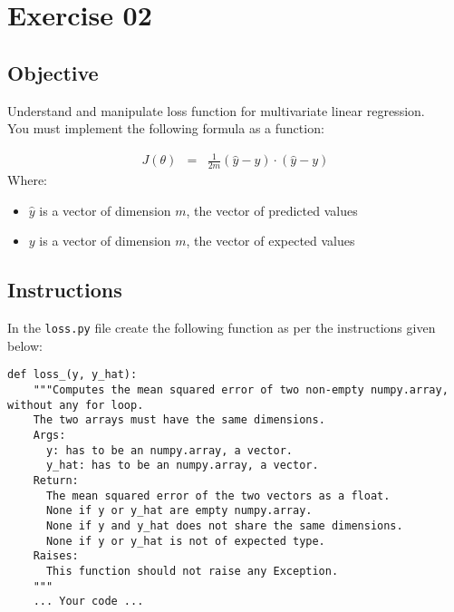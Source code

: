 \chapter{Exercise 02}

\newpage
{}
\makeheaderfilesforbidden

\section*{Objective}
Understand and manipulate loss function for multivariate linear regression.\\
\newline
You must implement the following formula as a function:  

$$
\begin{matrix}
J(\theta) &  = & \frac{1}{2m}(\hat{y} - y) \cdot(\hat{y}- y)
\end{matrix}
$$  
Where:
\begin{itemize}
  \item $\hat{y}$ is a vector of dimension $m$, the vector of predicted values
  \item $y$ is a vector of dimension $m$, the vector of expected values
\end{itemize}
\section*{Instructions}
In the \texttt{loss.py} file create the following function as per the instructions given below:\\
\newline
\begin{verbatim}
def loss_(y, y_hat):
    """Computes the mean squared error of two non-empty numpy.array, without any for loop.
    The two arrays must have the same dimensions.
    Args:
      y: has to be an numpy.array, a vector.
      y_hat: has to be an numpy.array, a vector.
    Return:
      The mean squared error of the two vectors as a float.
      None if y or y_hat are empty numpy.array.
      None if y and y_hat does not share the same dimensions.
      None if y or y_hat is not of expected type.
    Raises:
      This function should not raise any Exception.
    """
    ... Your code ...
\end{verbatim}
\newpage
